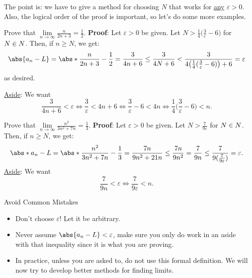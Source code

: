 The point is: we have to give a method for choosing $ N $ that works for \underline{any} $ \varepsilon>0 $. Also, the logical order of the
proof is important, so let's do some more examples.

\begin{Example}{}{}
    Prove that $ \displaystyle \lim\limits_{{n} \to {\infty}}\frac{n}{2n+3}=\frac{1}{2} $.
    \tcblower{}
    \textbf{Proof}: Let $ \varepsilon>0 $ be given. Let $ N>\frac{1}{4}\bigl(\frac{3}{\varepsilon}-6\bigr) $ for $ N\in\relax{N} $.
    Then, if $ n\ge N $, we get:
    \[ \abs{a_n-L}=\abs*{\frac{n}{2n+3}-\frac{1}{2}}=\frac{3}{4n+6}\le \frac{3}{4N+6}<\frac{3}{4\bigl(\frac{1}{4}(\frac{3}{\varepsilon}-6)\bigr)+6}=\varepsilon \]
    as desired.

    \underline{Aside}: We want
    \[ \frac{3}{4n+6}<\varepsilon\iff \frac{3}{\varepsilon}<4n+6\iff \frac{3}{\varepsilon}-6<4n\iff \frac{1}{4}\biggl(\frac{3}{\varepsilon}-6\biggr)<n. \]
\end{Example}
\begin{Example}{}{}
    Prove that $ \displaystyle \lim\limits_{{n} \to {\infty}}\frac{n^2}{3n^2+7n}=\frac{1}{3} $.
    \tcblower{}
    \textbf{Proof}: Let $ \varepsilon>0 $ be given. Let $ N>\frac{7}{9\varepsilon} $ for $ N\in\relax{N} $.
    Then, if $ n\ge N $, we get:
    \[ \abs*{a_n-L}=\abs*{\frac{n^2}{3n^2+7n}-\frac{1}{3}}=\frac{7n}{9n^2+21n}\le \frac{7n}{9n^2}=\frac{7}{9n}\le \frac{7}{9(\frac{7}{9\varepsilon})}=\varepsilon. \]
    \underline{Aside}: We want
    \[ \frac{7}{9n}<\varepsilon\iff \frac{7}{9\varepsilon}<n. \]
\end{Example}
\begin{Remark}{Avoid Common Mistakes}{}
    \begin{itemize}
        \item Don't choose $ \varepsilon $! Let it be arbitrary.
        \item Never assume $ \abs{a_n-L}<\varepsilon $, make sure you only do work in an aside with that inequality since it is what you
              are proving.
        \item In practice, unless you are asked to, do not use this formal definition. We will now try to develop better methods for finding limits.
    \end{itemize}
\end{Remark}
